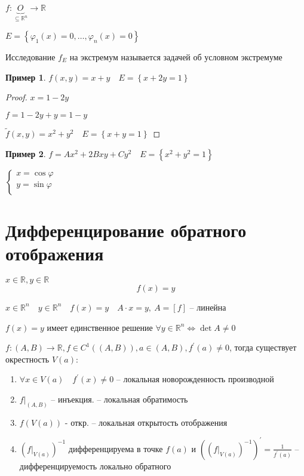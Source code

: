 \documentclass{book}
\newcommand\R{\ensuremath{\mathbb{R}}}
\newcommand{\p}[1]{#1^{\prime}}
\newcommand{\tl}[1]{\widetilde{#1}}
\theoremstyle{definition}
\newtheorem*{example}{Пример}
\begin{document}
        \begin{problem}
            $f: \underbrace{O}_{\subseteq \R^n} \to  \R$

            $E = \left\{\varphi_1(x)=0, \ldots, \varphi_n(x) = 0  \right\} $

            Исследование $f_{E}$ на экстремум называется задачей об условном экстремуме
        \end{problem}

        \begin{example}
            $f(x, y) = x+y\quad E = \left\{ x+2y = 1 \right\} $
        \end{example}
        \begin{proof}
            $x = 1-2y$

             $f = 1-2y+y = 1-y$

             $\tl f(x, y) = x^2+y^2\quad E = \left\{ x+y=1 \right\} $
        \end{proof}
        \begin{example}
            $f = Ax^2 + 2Bxy + Cy^2\quad E = \left\{ x^2+y^2=1 \right\} $

            $\begin{cases}
                x = \cos \varphi\\
                y = \sin \varphi\\
            \end{cases}$ 


        \end{example}

        \section{Дифференцирование обратного отображения}

        $x\in \R, y\in \R\quad$\[ f(x) = y\]

        $x\in \R^n\quad y\in \R^n\quad f(x) = y\quad A \cdot  x = y, \ A = [f]$  -- линейна

        $f(x) = y$ имеет единственное решение  $\forall y\in \R^n \iff \det A \neq  0$
        
        \begin{theorem}

            $f: (A, B) \to  \R, f\in C^1((A, B)), a\in (A, B), \p f(a)\neq 0$, тогда существует окрестность $V(a):$
            \begin{enumerate}
                \item $\forall x\in V(a)\quad \p f(x)\neq 0$ -- локальная новорожденность производной
                \item $f|_{(A, B)}$ -- инъекция. -- локальная обратимость
                \item  $f(V(a))$ - откр. -- локальная открытость отображения
                \item $\left( f|_{V(a)} \right)^{-1} $ дифференцируема в точке $f(a)$ и  $\left( \left( f|_{V(a)} \right)^{-1}  \right)^{\prime} = \frac{1}{\p f(a)} $ -- дифференцируемость локально обратного
            \end{enumerate}
        \end{theorem}
\end{document}
